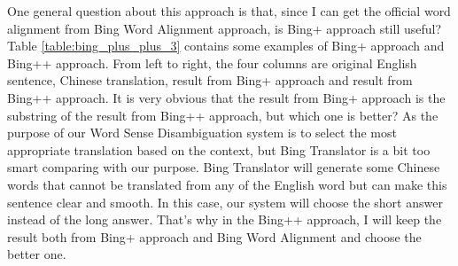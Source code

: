 One general question about this approach is that, since I can get the official word alignment from Bing Word Alignment approach, is Bing+ approach still useful? Table \ref{table:bing_plus_plus_3} contains some examples of Bing+ approach and Bing++ approach. From left to right, the four columns are original English sentence, Chinese translation, result from Bing+ approach and result from Bing++ approach. It is very obvious that the result from Bing+ approach is the substring of the result from Bing++ approach, but which one is better? As the purpose of our Word Sense Disambiguation system is to select the most appropriate translation based on the context, but Bing Translator is a bit too smart comparing with our purpose. Bing Translator will generate some Chinese words that cannot be translated from any of the English word but can make this sentence clear and smooth. In this case, our system will choose the short answer instead of the long answer. That's why in the Bing++ approach, I will keep the result both from Bing+ approach and Bing Word Alignment and choose the better one.
\\

